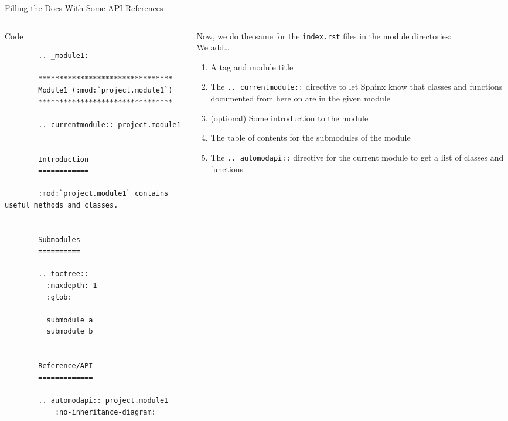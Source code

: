 \begin{frame}[fragile]{Filling the Docs With Some API References}

  \begin{columns}[onlytextwidth]
    \begin{column}{0.52\textwidth}
      \begin{block}{Code}
      \scriptsize
      \begin{verbatim}
        .. _module1:

        ********************************
        Module1 (:mod:`project.module1`)
        ********************************

        .. currentmodule:: project.module1


        Introduction
        ============

        :mod:`project.module1` contains useful methods and classes.


        Submodules
        ==========

        .. toctree::
          :maxdepth: 1
          :glob:

          submodule_a
          submodule_b


        Reference/API
        =============

        .. automodapi:: project.module1
            :no-inheritance-diagram:
      \end{verbatim}
      \end{block}
    \end{column}
    \hfill
    \begin{column}{0.46\textwidth}
      Now, we do the same for the \texttt{index.rst} files in the module directories:\\[1em]
      We add\dots
      \begin{enumerate}
        \setlength{\itemsep}{1.5em}
        \item A tag and module title
        \item The \texttt{.. currentmodule::} directive to let Sphinx know that
          classes and functions documented from here on are in the given module
        \item (optional) Some introduction to the module
        \item The table of contents for the submodules of the module
        \item The \texttt{.. automodapi::} directive for the current module to get a list of
          classes and functions
      \end{enumerate}
    \end{column}
  \end{columns}
\end{frame}

